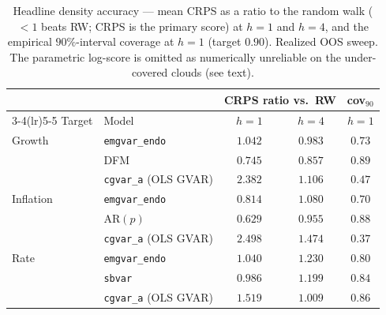 \documentclass[11pt]{article}
\theoremstyle{definition}
\theoremstyle{remark}
\begin{document}
\begin{table}[!ht]
\centering
\caption{Headline density accuracy --- mean CRPS as a ratio to the random
walk ($<1$ beats RW; CRPS is the primary score) at $h{=}1$ and $h{=}4$,
and the empirical $90\%$-interval coverage at $h{=}1$ (target $0.90$).
Realized OOS sweep. The parametric log-score is omitted as numerically
unreliable on the under-covered clouds (see text).}
\label{tab:empirical:crps}
\begin{tabular}{llccc}
\toprule
& & \multicolumn{2}{c}{CRPS ratio vs.\ RW} & cov$_{90}$ \\
\cmidrule(lr){3-4}\cmidrule(lr){5-5}
Target & Model & $h{=}1$ & $h{=}4$ & $h{=}1$ \\
\midrule
Growth    & \texttt{emgvar\_endo}        & $1.042$ & $0.983$ & $0.73$ \\
          & DFM                          & $0.745$ & $0.857$ & $0.89$ \\
          & \texttt{cgvar\_a} (OLS GVAR) & $2.382$ & $1.106$ & $0.47$ \\
\midrule
Inflation & \texttt{emgvar\_endo}        & $0.814$ & $1.080$ & $0.70$ \\
          & AR$(p)$                      & $0.629$ & $0.955$ & $0.88$ \\
          & \texttt{cgvar\_a} (OLS GVAR) & $2.498$ & $1.474$ & $0.37$ \\
\midrule
Rate      & \texttt{emgvar\_endo}        & $1.040$ & $1.230$ & $0.80$ \\
          & \texttt{sbvar}               & $0.986$ & $1.199$ & $0.84$ \\
          & \texttt{cgvar\_a} (OLS GVAR) & $1.519$ & $1.009$ & $0.86$ \\
\bottomrule
\end{tabular}
\end{table}
\end{document}
